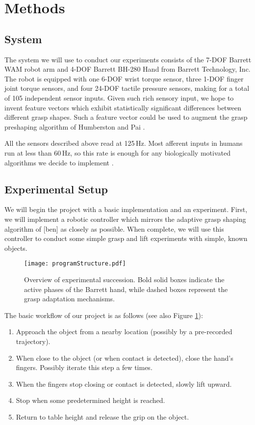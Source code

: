 \renewcommand{\thesection}{\Roman{section}}
\section{Methods}

\subsection*{System}

\quad The system we will use to conduct our experiments consists of the 7-DOF Barrett WAM robot arm and 4-DOF Barrett BH-280 Hand from Barrett Technology, Inc. The robot is equipped with one 6-DOF wrist torque sensor, three 1-DOF finger joint torque sensors, and four 24-DOF tactile pressure sensors, making for a total of 105 independent sensor inputs. Given such rich sensory input, we hope to invent feature vectors which exhibit statistically significant differences between different grasp shapes. Such a feature vector could be used to augment the grasp preshaping algorithm of Humberston and Pai \cite{Ben}.

All the sensors described above read at 125\,Hz. Most afferent inputs in humans run at less than 60\,Hz, so this rate is enough for any biologically motivated algorithms we decide to implement \cite{Howe}.

\subsection*{Experimental Setup}

\quad We will begin the project with a basic implementation and an experiment. First, we will implement a robotic controller which mirrors the adaptive grasp shaping algorithm of [ben] as closely as possible. When complete, we will use this controller to conduct some simple grasp and lift experiments with simple, known objects.
\begin{figure}[H]
	\centering
	\texttt{[image: programStructure.pdf]}	
	\caption{Overview of experimental succession. Bold solid boxes indicate the active 
phases of the Barrett hand, while dashed boxes represent the grasp adaptation mechanisms.}
	\label{workflow}
\end{figure}
The basic workflow of our project is as follows (see also Figure \ref{workflow}):
\begin{enumerate}
\item Approach the object from a nearby location (possibly by a pre-recorded trajectory).
\item When close to the object (or when contact is detected), close the hand's fingers. Possibly iterate this step a few times.
\item When the fingers stop closing or contact is detected, slowly lift upward.
\item Stop when some predetermined height is reached.
\item Return to table height and release the grip on the object.
\end{enumerate}

